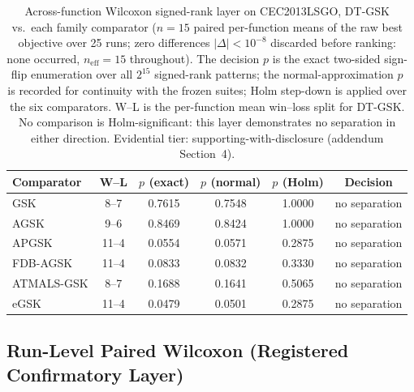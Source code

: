\documentclass[algorithms,article,submit,moreauthors,pdftex]{Definitions/mdpi}
\newcommand{\dtgsk}{DT-GSK}
\newcommand{\zebra}{}
\begin{document}
\begin{table}[H]
\caption{Across-function Wilcoxon signed-rank layer on CEC2013LSGO,
\dtgsk{} vs.\ each family comparator ($n = 15$ paired per-function
means of the raw best objective over 25 runs; zero differences
$|\Delta| < 10^{-8}$ discarded before ranking: none occurred,
$n_{\mathrm{eff}} = 15$ throughout).  The decision $p$ is the exact
two-sided sign-flip enumeration over all $2^{15}$ signed-rank patterns;
the normal-approximation $p$ is recorded for continuity with the frozen
suites; Holm step-down is applied over the six comparators.  W--L is the
per-function mean win--loss split for \dtgsk{}.  No comparison is
Holm-significant: this layer demonstrates no separation in either
direction.  Evidential tier: supporting-with-disclosure (addendum
Section~4).
}\label{tab:supp:lsgo:wilcoxon}
\centering
\tablesize{\footnotesize}
\zebra
\begin{tabular}{lccccc}
\toprule
\textbf{Comparator} & \textbf{W--L} & \textbf{$p$ (exact)} &
\textbf{$p$ (normal)} & \textbf{$p$ (Holm)} & \textbf{Decision} \\
\midrule
GSK & 8--7 & 0.7615 & 0.7548 & 1.0000 & no separation \\
AGSK & 9--6 & 0.8469 & 0.8424 & 1.0000 & no separation \\
APGSK & 11--4 & 0.0554 & 0.0571 & 0.2875 & no separation \\
FDB-AGSK & 11--4 & 0.0833 & 0.0832 & 0.3330 & no separation \\
ATMALS-GSK & 8--7 & 0.1688 & 0.1641 & 0.5065 & no separation \\
eGSK & 11--4 & 0.0479 & 0.0501 & 0.2875 & no separation \\
\bottomrule
\end{tabular}
\end{table}

\subsection{Run-Level Paired Wilcoxon (Registered Confirmatory Layer)}\label{sec:supp:lsgo:runlevel}
\end{document}

